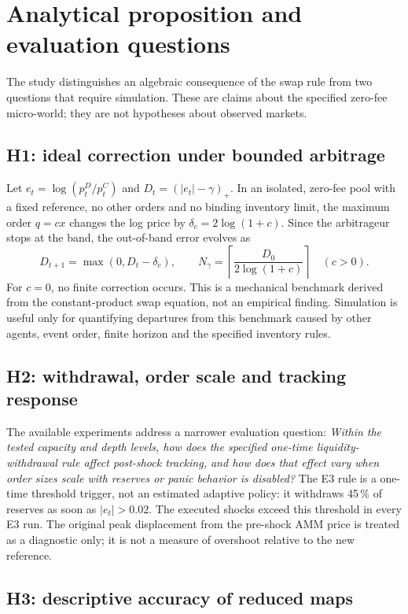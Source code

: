\chapter{Analytical proposition and evaluation questions}
\label{cap:hipotesis}

The study distinguishes an algebraic consequence of the swap rule from two questions that require simulation. These are claims about the specified zero-fee micro-world; they are not hypotheses about observed markets.

\section{H1: ideal correction under bounded arbitrage}

Let $e_t=\log(p_t^D/p_t^C)$ and $D_t=(|e_t|-\gamma)_+$. In an isolated, zero-fee pool with a fixed reference, no other orders and no binding inventory limit, the maximum order $q=cx$ changes the log price by $\delta_c=2\log(1+c)$. Since the arbitrageur stops at the band, the out-of-band error evolves as
\[
  D_{t+1}=\max(0,D_t-\delta_c),\qquad
  N_\gamma=\left\lceil\frac{D_0}{2\log(1+c)}\right\rceil \quad(c>0).
\]
For $c=0$, no finite correction occurs. This is a mechanical benchmark derived from the constant-product swap equation, not an empirical finding. Simulation is useful only for quantifying departures from this benchmark caused by other agents, event order, finite horizon and the specified inventory rules.

\section{H2: withdrawal, order scale and tracking response}

The available experiments address a narrower evaluation question:
\emph{Within the tested capacity and depth levels, how does the specified one-time liquidity-withdrawal rule affect post-shock tracking, and how does that effect vary when order sizes scale with reserves or panic behavior is disabled?}
The E3 rule is a one-time threshold trigger, not an estimated adaptive policy: it withdraws 45\,\% of reserves as soon as $|e_t|>0.02$. The executed shocks exceed this threshold in every E3 run. The original peak displacement from the pre-shock AMM price is treated as a diagnostic only; it is not a measure of overshoot relative to the new reference.

\section{H3: descriptive accuracy of reduced maps}

